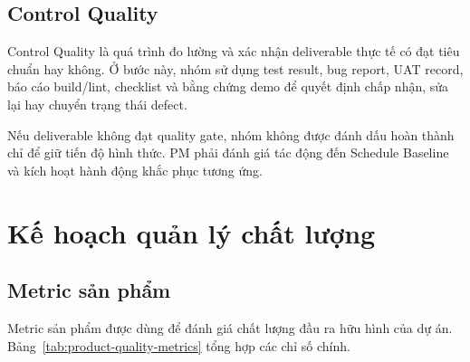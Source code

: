 \subsection{Control Quality}

Control Quality là quá trình đo lường và xác nhận deliverable thực tế có đạt tiêu chuẩn hay không. Ở bước này, nhóm sử dụng test result, bug report, UAT record, báo cáo build/lint, checklist và bằng chứng demo để quyết định chấp nhận, sửa lại hay chuyển trạng thái defect.

Nếu deliverable không đạt quality gate, nhóm không được đánh dấu hoàn thành chỉ để giữ tiến độ hình thức. PM phải đánh giá tác động đến Schedule Baseline và kích hoạt hành động khắc phục tương ứng.


\fi
\section{Kế hoạch quản lý chất lượng}

\subsection{Metric sản phẩm}

Metric sản phẩm được dùng để đánh giá chất lượng đầu ra hữu hình của dự án. Bảng~\ref{tab:product-quality-metrics} tổng hợp các chỉ số chính.

